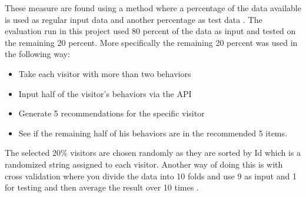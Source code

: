 These measure are found using a method where a percentage of the data available is used as regular input data and another percentage as test data \cite{eval}. The evaluation run in this project used 80 percent of the data as input and tested on the remaining 20 percent. More specifically the remaining 20 percent was used in the following way:
\begin{itemize}
\item Take each visitor with more than two behaviors
\item Input half of the visitor's behaviors via the API
\item Generate 5 recommendations for the specific visitor
\item See if the remaining half of his behaviors are in the recommended 5 items.
\end{itemize}
The selected 20\% visitors are chosen randomly as they are sorted by Id which is a randomized string assigned to each visitor. Another way of doing this is with cross validation where you divide the data into 10 folds and use 9 as input and 1 for testing and then average the result over 10 times \cite{eval}.

